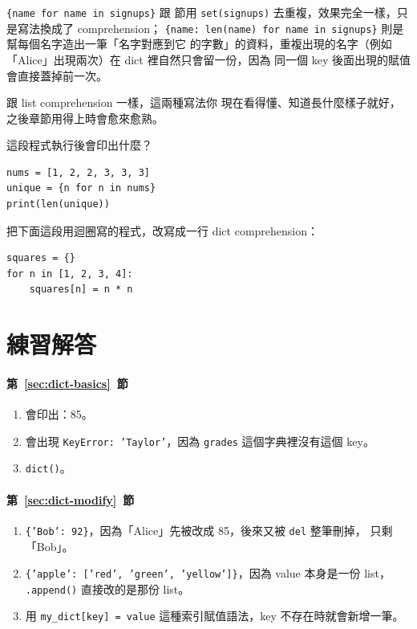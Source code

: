 
\texttt{\{name for name in signups\}} 跟  節用
\texttt{set(signups)} 去重複，效果完全一樣，只是寫法換成了 comprehension；
\texttt{\{name: len(name) for name in signups\}} 則是幫每個名字造出一筆「名字對應到它
的字數」的資料，重複出現的名字（例如「Alice」出現兩次）在 dict 裡自然只會留一份，因為
同一個 key 後面出現的賦值會直接蓋掉前一次。

跟 list comprehension 一樣，這兩種寫法你
現在看得懂、知道長什麼樣子就好，之後章節用得上時會愈來愈熟。

\begin{drills}[label=drills:comprehension]
\item 這段程式執行後會印出什麼？
\begin{verbatim}
nums = [1, 2, 2, 3, 3, 3]
unique = {n for n in nums}
print(len(unique))
\end{verbatim}
\item 把下面這段用迴圈寫的程式，改寫成一行 dict comprehension：
\begin{verbatim}
squares = {}
for n in [1, 2, 3, 4]:
    squares[n] = n * n
\end{verbatim}
\end{drills}

\section*{練習解答}

\paragraph{第~\ref{sec:dict-basics}~節}
\begin{enumerate}
\item 會印出：85。
\item 會出現 \texttt{KeyError: 'Taylor'}，因為 \texttt{grades} 這個字典裡沒有這個 key。
\item \texttt{dict()}。
\end{enumerate}

\paragraph{第~\ref{sec:dict-modify}~節}
\begin{enumerate}
\item \texttt{\{'Bob': 92\}}，因為「Alice」先被改成 85，後來又被 \texttt{del} 整筆刪掉，
只剩「Bob」。
\item \texttt{\{'apple': ['red', 'green', 'yellow']\}}，因為 value 本身是一份 list，
\texttt{.append()} 直接改的是那份 list。
\item 用 \texttt{my\_dict[key] = value} 這種索引賦值語法，key 不存在時就會新增一筆。
\end{enumerate}

